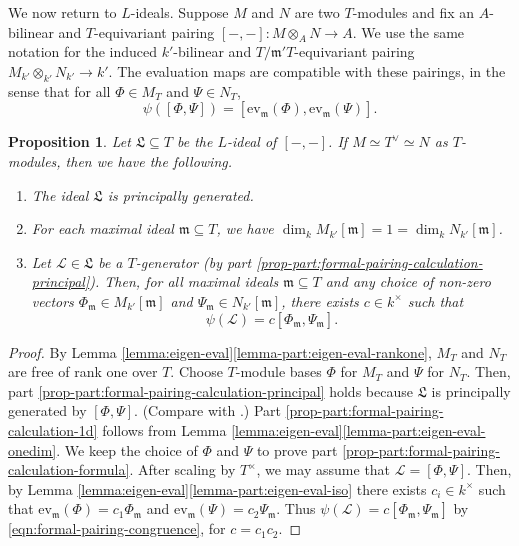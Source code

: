 \documentclass[10pt, twoside]{amsart}
\theoremstyle{plain}
\newtheorem{proposition}[theorem]{Proposition}
\theoremstyle{definition}
\theoremstyle{remark}
\numberwithin{equation}{subsection}
\def\gm{\mathfrak m}
\def\gL{\mathfrak L}
\def\call{\mathcal L}
\def\ev{\mathrm{ev}}
\begin{document}
We now return to $L$-ideals. Suppose $M$ and $N$ are two $T$-modules and fix an $A$-bilinear and $T$-equivariant pairing $[-,-] : M\otimes_A N \rightarrow A$. We use the same notation for the induced ${ k'}$-bilinear and $T/\gm'T$-equivariant pairing $M_{ k'}\otimes_{ k'} N_{ k'} \rightarrow { k'}$. The evaluation maps are compatible with these pairings, in the sense that for all $\Phi \in M_T$ and $\Psi \in N_T$,
\begin{equation}\label{eqn:formal-pairing-congruence}
\psi([\Phi,\Psi]) = [\ev_{\gm}(\Phi),\ev_{\gm}(\Psi)].
\end{equation}

\begin{proposition}\label{prop:formal-pairing-calculation}
Let $\gL \subseteq T$ be the $L$-ideal of $[-,-]$. If $M \simeq T^\vee \simeq N$ as $T$-modules, then we have the following.
\begin{enumerate}[label=(\roman*)]
\item The ideal $\gL$ is principally generated.\label{prop-part:formal-pairing-calculation-principal}
\item For each maximal ideal $\gm \subseteq T$, we have $\dim_{ k} M_{ k'}[\gm] = 1 = \dim_{ k} N_{ k'}[\gm]$.\label{prop-part:formal-pairing-calculation-1d}
\item Let $\call \in \gL$ be a $T$-generator (by part \ref{prop-part:formal-pairing-calculation-principal}). Then, for all maximal ideals $\gm \subseteq T$ and any choice of  non-zero vectors $\Phi_{\gm} \in M_{ k'}[\gm]$ and $\Psi_{\gm} \in N_{ k'}[\gm]$, there exists $c \in { k}^\times$ such that\label{prop-part:formal-pairing-calculation-formula}
$$
\psi(\call) = c [\Phi_{\gm},\Psi_{\gm}].
$$
\end{enumerate}
\end{proposition}
\begin{proof}
By Lemma \ref{lemma:eigen-eval}\ref{lemma-part:eigen-eval-rankone}, $M_T$ and $N_T$ are free of rank one over $T$. Choose $T$-module bases $\Phi$ for $M_T$ and $\Psi$ for $N_T$. Then, part \ref{prop-part:formal-pairing-calculation-principal} holds because $\gL$ is principally generated by $[\Phi,\Psi]$. (Compare with \cite[Proposition 9.1.11]{Bel}.) Part \ref{prop-part:formal-pairing-calculation-1d} follows from Lemma \ref{lemma:eigen-eval}\ref{lemma-part:eigen-eval-onedim}. We keep the choice of $\Phi$ and $\Psi$ to prove part \ref{prop-part:formal-pairing-calculation-formula}. After scaling by $T^\times$, we may assume that $\call = [\Phi,\Psi]$. Then, by Lemma \ref{lemma:eigen-eval}\ref{lemma-part:eigen-eval-iso} there exists $c_i \in { k}^\times$ such that $\ev_{\gm}(\Phi) = c_1\Phi_{\gm}$ and $\ev_{\gm}(\Psi) = c_2 \Psi_{\gm}$. Thus $\psi(\call) = c[\Phi_{\gm},\Psi_{\gm}]$ by \eqref{eqn:formal-pairing-congruence}, for $c = c_1c_2$.
\end{proof}
\end{document}
